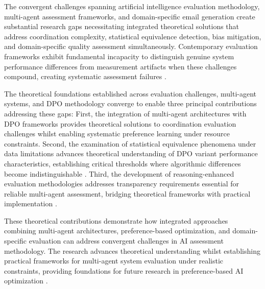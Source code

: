 The convergent challenges spanning artificial intelligence evaluation methodology, multi-agent assessment frameworks, and domain-specific email generation create substantial research gaps necessitating integrated theoretical solutions that address coordination complexity, statistical equivalence detection, bias mitigation, and domain-specific quality assessment simultaneously. Contemporary evaluation frameworks exhibit fundamental incapacity to distinguish genuine system performance differences from measurement artifacts when these challenges compound, creating systematic assessment failures \cite{xiao2024comprehensive_dpo_survey}.

The theoretical foundations established across evaluation challenges, multi-agent systems, and DPO methodology converge to enable three principal contributions addressing these gaps: First, the integration of multi-agent architectures with DPO frameworks provides theoretical solutions to coordination evaluation challenges whilst enabling systematic preference learning under resource constraints. Second, the examination of statistical equivalence phenomena under data limitations advances theoretical understanding of DPO variant performance characteristics, establishing critical thresholds where algorithmic differences become indistinguishable \cite{rafailov2024q_learning, pan2025pre_dpo}. Third, the development of reasoning-enhanced evaluation methodologies addresses transparency requirements essential for reliable multi-agent assessment, bridging theoretical frameworks with practical implementation \cite{bukharin2023heron, lang2024rlp}.

These theoretical contributions demonstrate how integrated approaches combining multi-agent architectures, preference-based optimization, and domain-specific evaluation can address convergent challenges in AI assessment methodology. The research advances theoretical understanding whilst establishing practical frameworks for multi-agent system evaluation under realistic constraints, providing foundations for future research in preference-based AI optimization \cite{zhou2024wpo, sun2025mapl}.
